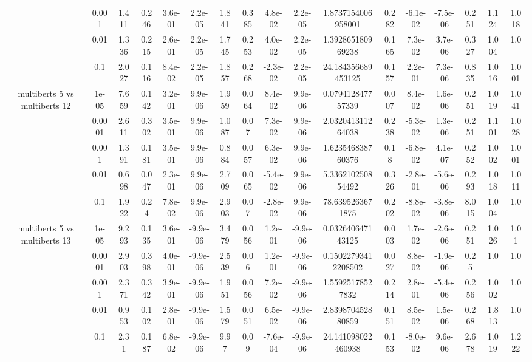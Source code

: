 \begin{tabular}{|c|c|c|c|c|c|c|c|c|c|c|c|c|c|c|c|c|}
 & 0.001 & 1.411 & 0.246 & 3.6e-01 & 2.2e-05 & 1.841 & 0.385 & 4.8e-02 & 2.2e-05 & 1.8737154006958001 & 0.282 & -6.1e-02 & -7.5e-06 & 0.251 & 1.124 & 1.018 \\
 & 0.01 & 1.336 & 0.215 & 2.6e-01 & 2.2e-05 & 1.745 & 0.253 & 4.0e-02 & 2.2e-05 & 1.392865180969238 & 0.165 & 7.3e-02 & 3.7e-06 & 0.327 & 1.004 & 1.0 \\
 & 0.1 & 2.027 & 0.116 & 8.4e-02 & 2.2e-05 & 1.857 & 0.268 & -2.3e-02 & 2.2e-05 & 24.184356689453125 & 0.157 & 2.2e-01 & 7.3e-06 & 0.835 & 1.016 & 1.001 \\
\hline
\multirow{5}{*}{multiberts 5 vs multiberts 12} & 1e-05 & 7.659 & 0.142 & 3.2e-01 & 9.9e-06 & 1.959 & 0.064 & 8.4e-02 & 9.9e-06 & 0.079412847757339 & 0.007 & 8.4e-02 & 1.6e-06 & 0.251 & 1.019 & 1.041 \\
 & 0.0001 & 2.611 & 0.302 & 3.5e-01 & 9.9e-06 & 1.087 & 0.07 & 7.3e-02 & 9.9e-06 & 2.032041311264038 & 0.238 & -5.3e-02 & 1.3e-06 & 0.251 & 1.101 & 1.028 \\
 & 0.001 & 1.391 & 0.181 & 3.5e-01 & 9.9e-06 & 0.884 & 0.057 & 6.3e-02 & 9.9e-06 & 1.623546838760376 & 0.18 & -6.8e-02 & 4.1e-07 & 0.252 & 1.002 & 1.001 \\
 & 0.01 & 0.698 & 0.047 & 2.3e-01 & 9.9e-06 & 2.709 & 0.065 & -5.4e-02 & 9.9e-06 & 5.336210250854492 & 0.326 & -2.8e-01 & -5.6e-06 & 0.293 & 1.018 & 1.011 \\
 & 0.1 & 1.922 & 0.24 & 7.8e-02 & 9.9e-06 & 2.903 & 0.07 & -2.8e-02 & 9.9e-06 & 78.6395263671875 & 0.202 & -8.8e-02 & -3.8e-06 & 8.015 & 1.004 & 1.0 \\
\hline
\multirow{5}{*}{multiberts 5 vs multiberts 13} & 1e-05 & 9.293 & 0.135 & 3.6e-01 & -9.9e-06 & 3.479 & 0.056 & 1.2e-01 & -9.9e-06 & 0.032640647143125 & 0.003 & 1.7e-02 & -2.6e-06 & 0.251 & 1.026 & 1.01 \\
 & 0.0001 & 2.903 & 0.398 & 4.0e-01 & -9.9e-06 & 2.539 & 0.06 & 1.2e-01 & -9.9e-06 & 0.15022793412208502 & 0.027 & 8.8e-02 & -1.9e-06 & 0.25 & 1.0 & 1.0 \\
 & 0.001 & 2.371 & 0.342 & 3.9e-01 & -9.9e-06 & 1.951 & 0.056 & 7.2e-02 & -9.9e-06 & 1.55925178527832 & 0.214 & 2.8e-01 & -5.4e-06 & 0.256 & 1.002 & 1.0 \\
 & 0.01 & 0.953 & 0.102 & 2.8e-01 & -9.9e-06 & 1.579 & 0.051 & 6.5e-02 & -9.9e-06 & 2.839870452880859 & 0.151 & 8.5e-02 & 1.5e-06 & 0.268 & 1.813 & 1.0 \\
 & 0.1 & 2.31 & 0.187 & 6.8e-02 & -9.9e-06 & 9.97 & 0.09 & -7.6e-04 & -9.9e-06 & 24.141098022460938 & 0.153 & -8.0e-02 & 9.6e-06 & 2.678 & 1.019 & 1.222 \\

\end{tabular}
